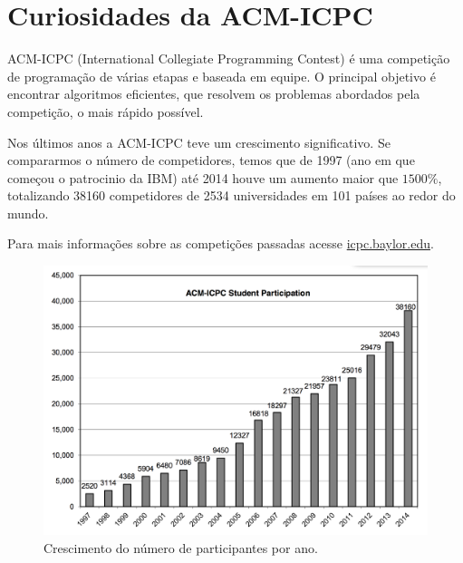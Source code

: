 
\chapter{Curiosidades da ACM-ICPC} %

\label{AppendixA} %

ACM-ICPC (International Collegiate Programming Contest) é uma competição de programação
de várias etapas e baseada em equipe. O principal objetivo é encontrar algoritmos
eficientes, que resolvem os problemas abordados pela competição, o mais rápido
possível.


Nos últimos anos a ACM-ICPC teve um crescimento significativo. Se compararmos
o número de competidores, temos que de 1997 (ano em que começou o patrocinio
da IBM) até 2014 houve um aumento maior que $1500\%$, totalizando 38160
competidores de 2534 universidades em 101 países ao redor do mundo.

Para mais informa\c{c}\~oes sobre as competi\c{c}\~oes passadas acesse \href{icpc.baylor.edu}{icpc.baylor.edu}.

\begin{figure}[p]
    \centering
    \includegraphics[width=1\linewidth]{Figures/grafico.png}
    \caption{Crescimento do n\'umero de participantes por ano.}
\end{figure}

